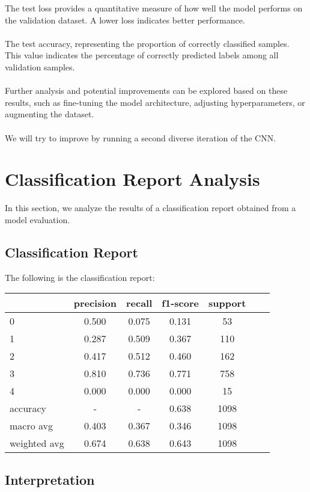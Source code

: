 \documentclass{article}
\begin{document}
The test loss provides a quantitative measure of how well the model performs on the validation dataset.
A lower loss indicates better performance.
\\
\\
The test accuracy, representing the proportion of correctly classified samples. This value indicates the percentage of correctly predicted labels among all validation samples.
\\
\\
Further analysis and potential improvements can be explored based on these results, such as fine-tuning the model architecture, adjusting hyperparameters, or augmenting the dataset.
\\
\\
We will try to improve by running a second diverse iteration of the CNN.

\section{Classification Report Analysis}

In this section, we analyze the results of a classification report obtained from a model evaluation.

\subsection{Classification Report}

The following is the classification report:
\\
\begin{center}
\centering
\begin{tabular}{lcccccc}
\hline
& precision & recall & f1-score & support \\
\hline
0 & 0.500 & 0.075 & 0.131 & 53 \\
1 & 0.287 & 0.509 & 0.367 & 110 \\
2 & 0.417 & 0.512 & 0.460 & 162 \\
3 & 0.810 & 0.736 & 0.771 & 758 \\
4 & 0.000 & 0.000 & 0.000 & 15 \\
\hline
accuracy & - & - & 0.638 & 1098 \\
macro avg & 0.403 & 0.367 & 0.346 & 1098 \\
weighted avg & 0.674 & 0.638 & 0.643 & 1098 \\
\hline
\end{tabular}
\end{center}

\subsection{Interpretation}
\end{document}
